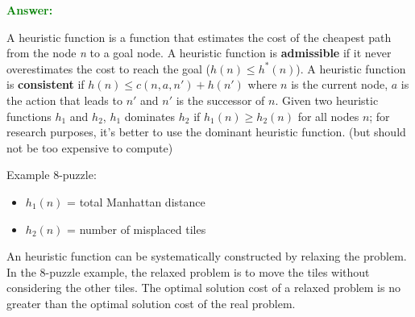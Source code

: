 \documentclass[12pt]{article}
\begin{document}
\begin{enumerate}[label=\textbf{IS.\arabic*}]
    \textcolor{green}{\textbf{Answer:}}

    A heuristic function is a function that estimates the cost of the cheapest path from the node \textit{n} to a goal node.
    A heuristic function is \textbf{admissible} if it never overestimates the cost to reach the goal ($h(n) \leq h^*(n)$).
    A heuristic function is \textbf{consistent} if $h(n) \leq c(n,a,n') + h(n')$ where $n$ is the current node, 
    $a$ is the action that leads to $n'$ and $n'$ is the successor of $n$.
    Given two heuristic functions $h_1$ and $h_2$, $h_1$ dominates $h_2$ if $h_1(n) \geq h_2(n)$ for all nodes $n$; for research purposes,
    it's better to use the dominant heuristic function. (but should not be too expensive to compute)

    Example 8-puzzle:
    \begin{itemize}
        \item $h_1(n)$ = total Manhattan distance
        \item $h_2(n)$ = number of misplaced tiles
    \end{itemize}

    An heuristic function can be systematically constructed by relaxing the problem.
    In the 8-puzzle example, the relaxed problem is to move the tiles without considering the other tiles.
    The optimal solution cost of a relaxed problem is no greater than the optimal solution cost of the real problem.
\end{enumerate}
\end{document}
